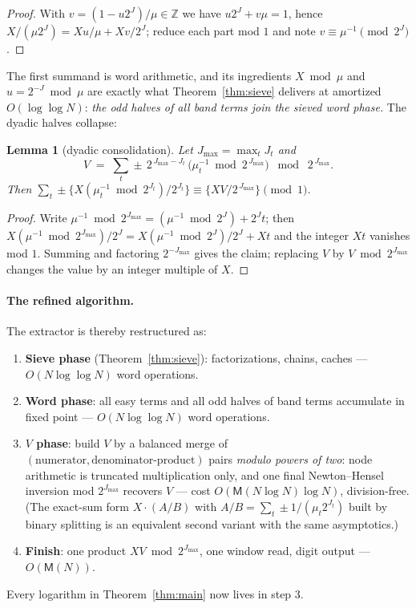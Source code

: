 \documentclass[11pt]{article}
\newtheorem{lemma}[theorem]{Lemma}
\theoremstyle{remark}
\theoremstyle{definition}
\newcommand{\M}{\mathsf{M}}
\newcommand{\Z}{\mathbb{Z}}
\begin{document}
\begin{proof}
With $v=(1-u2^{J})/\mu\in\Z$ we have $u2^{J}+v\mu=1$, hence
$X/(\mu2^{J})=Xu/\mu+Xv/2^{J}$; reduce each part mod $1$ and note
$v\equiv\mu^{-1}\pmod{2^{J}}$.
\end{proof}

The first summand is word arithmetic, and its ingredients
$X\bmod\mu$ and $u=2^{-J}\bmod\mu$ are exactly what
Theorem~\ref{thm:sieve} delivers at amortized $O(\log\log N)$: \emph{the
odd halves of all band terms join the sieved word phase.} The dyadic
halves collapse:

\begin{lemma}[dyadic consolidation]\label{lem:consolidate}
Let $J_{\max}=\max_t J_t$ and
\[
V \;=\; \sum_t \pm\, 2^{\,J_{\max}-J_t}\,
\bigl(\mu_t^{-1}\bmod 2^{\,J_{\max}}\bigr) \;\bmod\; 2^{\,J_{\max}} .
\]
Then
$\sum_t \pm\bigl\{X(\mu_t^{-1}\bmod 2^{J_t})/2^{J_t}\bigr\}
\equiv\bigl\{XV/2^{\,J_{\max}}\bigr\}\pmod 1$.
\end{lemma}

\begin{proof}
Write $\mu^{-1}\bmod 2^{J_{\max}}=(\mu^{-1}\bmod 2^{J})+2^{J}t$; then
$X(\mu^{-1}\bmod 2^{J_{\max}})/2^{J}=X(\mu^{-1}\bmod 2^{J})/2^{J}+Xt$
and the integer $Xt$ vanishes mod $1$. Summing and factoring
$2^{-J_{\max}}$ gives the claim; replacing $V$ by $V\bmod 2^{J_{\max}}$
changes the value by an integer multiple of $X$.
\end{proof}

\paragraph{The refined algorithm.}
The extractor is thereby restructured as:
\begin{enumerate}
\item \textbf{Sieve phase} (Theorem~\ref{thm:sieve}): factorizations,
chains, caches --- $O(N\log\log N)$ word operations.
\item \textbf{Word phase}: all easy terms and all odd halves of band
terms accumulate in fixed point --- $O(N\log\log N)$ word operations.
\item \textbf{$V$ phase}: build $V$ by a balanced merge of
$(\text{numerator},\text{denominator-product})$ pairs \emph{modulo powers
of two}: node arithmetic is truncated multiplication only, and one final
Newton--Hensel inversion mod $2^{J_{\max}}$ recovers $V$ --- cost
$O(\M(N\log N)\log N)$, division-free. (The exact-sum form
$X\cdot(A/B)$ with $A/B=\sum_t\pm1/(\mu_t2^{J_t})$ built by binary
splitting is an equivalent second variant with the same asymptotics.)
\item \textbf{Finish}: one product $XV\bmod 2^{J_{\max}}$, one window
read, digit output --- $O(\M(N))$.
\end{enumerate}
Every logarithm in Theorem~\ref{thm:main} now lives in step 3.
\end{document}
